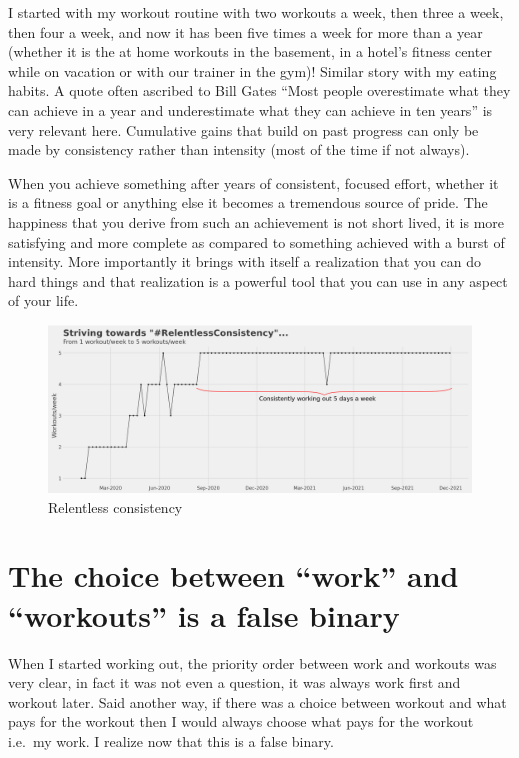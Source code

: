 \documentclass[
  oneside]{book}
\begin{document}
I started with my workout routine with two workouts a week, then three a week, then four a week, and now it has been five times a week for more than a year (whether it is the at home workouts in the basement, in a hotel's fitness center while on vacation or with our trainer in the gym)! Similar story with my eating habits. A quote often ascribed to Bill Gates ``Most people overestimate what they can achieve in a year and underestimate what they can achieve in ten years'' is very relevant here. Cumulative gains that build on past progress can only be made by consistency rather than intensity (most of the time if not always).

When you achieve something after years of consistent, focused effort, whether it is a fitness goal or anything else it becomes a tremendous source of pride. The happiness that you derive from such an achievement is not short lived, it is more satisfying and more complete as compared to something achieved with a burst of intensity. More importantly it brings with itself a realization that you can do hard things and that realization is a powerful tool that you can use in any aspect of your life.

\begin{figure}
\centering
\includegraphics{pictures/relentless.png}
\caption{Relentless consistency}
\end{figure}

\hypertarget{the-choice-between-work-and-workouts-is-a-false-binary}{%
\section{The choice between ``work'' and ``workouts'' is a false binary}\label{the-choice-between-work-and-workouts-is-a-false-binary}}

When I started working out, the priority order between work and workouts was very clear, in fact it was not even a question, it was always work first and workout later. Said another way, if there was a choice between workout and what pays for the workout then I would always choose what pays for the workout i.e.~my work. I realize now that this is a false binary.
\end{document}
